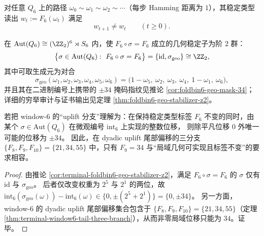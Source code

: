 \begin{enumerate}
  \begin{corollary}\label{cor:terminal-foldbin6-no-dwell}
  对任意 \(Q_6\) 上的路径 \(\omega_0\sim \omega_1\sim\omega_2\sim\cdots\)（每步 Hamming 距离为 \(1\)），其稳定类型读出 \(w_t:=F_6(\omega_t)\) 满足
  \[
  w_{t+1}\neq w_t\qquad (t\ge 0).
  \]
  \end{corollary}

  \begin{corollary}\label{cor:terminal-foldbin6-geo-stabilizer-z2}
  在 \(\mathrm{Aut}(Q_6)\cong (\ZZ_2)^6\rtimes S_6\) 内，使 \(F_6\circ\sigma=F_6\) 成立的几何稳定子为阶 \(2\) 群：
  \[
  \bigl\{\sigma\in\mathrm{Aut}(Q_6):\ F_6\circ\sigma=F_6\bigr\}=\{\mathrm{id},\sigma_{\mathrm{geo}}\}\cong \ZZ_2,
  \]
  其中可取生成元为对合
  \[
  \sigma_{\mathrm{geo}}(\omega_1,\omega_2,\omega_3,\omega_4,\omega_5,\omega_6)=\bigl(1-\omega_5,\ \omega_2,\ \omega_3,\ \omega_4,\ 1-\omega_1,\ \omega_6\bigr),
  \]
  并且其在二进制编号上携带的 \(\pm 34\) 掩码指纹见推论 \ref{cor:foldbin6-geo-mask-34}；详细的穷举审计与证书输出见定理 \ref{thm:foldbin6-geo-stabilizer-z2}。
  \end{corollary}

  \begin{corollary}[几何可实现性判别：window-\(6\) 的 uplift \texorpdfstring{$\delta$}{delta}-分支仅允许 \texorpdfstring{$\delta=34$}{δ=34}]\label{cor:terminal-window6-local-uplift-admissibility}
  若把 window-\(6\) 的“uplift 分支”理解为：在保持稳定类型标签 \(F_6\) 不变的同时，由某个 \(\sigma\in\mathrm{Aut}(Q_6)\) 在微观编号 \(\mathrm{int}_6\) 上实现的整数位移，
  则除平凡位移 \(0\) 外唯一可能的位移为 \(\pm 34\)。
  因此，在 dyadic uplift 尾部偏移的三分支 \(\{F_8,F_9,F_{10}\}=\{21,34,55\}\) 中，只有 \(F_9=34\) 与“局域几何可实现且标签不变”的要求相容。
  \end{corollary}
  \begin{proof}
  由推论 \ref{cor:terminal-foldbin6-geo-stabilizer-z2}，满足 \(F_6\circ\sigma=F_6\) 的 \(\sigma\) 仅有 \(\mathrm{id}\) 与 \(\sigma_{\mathrm{geo}}\)。
  后者仅改变权重为 \(2^5\) 与 \(2^1\) 的两位，故
  \(
  \mathrm{int}_6(\sigma_{\mathrm{geo}}(\omega))-\mathrm{int}_6(\omega)\in\{0,\pm(2^5+2^1)\}=\{0,\pm 34\}
  \)。
  另一方面，window-\(6\) 的 dyadic uplift 尾部偏移集合包含于 \(\{F_8,F_9,F_{10}\}=\{21,34,55\}\)（定理 \ref{thm:terminal-window6-tail-three-branch}），从而非零局域位移只能为 \(34\)。证毕。
  \end{proof}


\end{enumerate}
